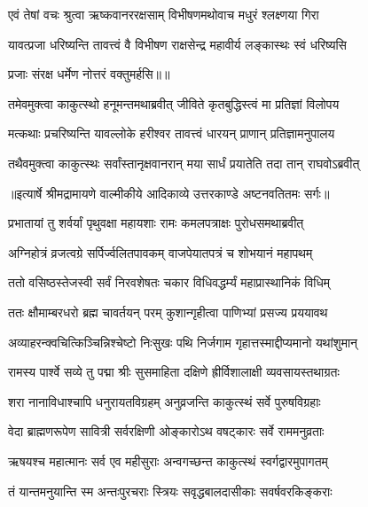 \twolineshloka
{एवं तेषां वचः श्रुत्वा ऋष्कवानररक्षसाम्}
{विभीषणमथोवाच मधुरं श्लक्ष्णया गिरा} %

\twolineshloka
{यावत्प्रजा धरिष्यन्ति तावत्त्वं वै विभीषण}
{राक्षसेन्द्र महावीर्य लङ्कास्थः स्वं धरिष्यसि} %

{प्रजाः संरक्ष धर्मेण नोत्तरं वक्तुमर्हसि॥॥} %

\addtocounter{shlokacount}{1}

\twolineshloka
{तमेवमुक्त्वा काकुत्स्थो हनूमन्तमथाब्रवीत्}
{जीविते कृतबुद्धिस्त्वं मा प्रतिज्ञां विलोपय} %

\twolineshloka
{मत्कथाः प्रचरिष्यन्ति यावल्लोके हरीश्वर}
{तावत्त्वं धारयन् प्राणान् प्रतिज्ञामनुपालय} %

\twolineshloka
{तथैवमुक्त्वा काकुत्स्थः सर्वांस्तानृक्षवानरान्}
{मया सार्धं प्रयातेति तदा तान् राघवोऽब्रवीत्} %


{॥इत्यार्षे श्रीमद्रामायणे वाल्मीकीये आदिकाव्ये उत्तरकाण्डे अष्टनवतितमः सर्गः॥}


\twolineshloka
{प्रभातायां तु शर्वर्यां पृथुवक्षा महायशाः}
{रामः कमलपत्राक्षः पुरोधसमथाब्रवीत्} %

\twolineshloka
{अग्निहोत्रं व्रजत्वग्रे सर्पिर्ज्वलितपावकम्}
{वाजपेयातपत्रं च शोभयानं महापथम्} %

\twolineshloka
{ततो वसिष्ठस्तेजस्वी सर्वं निरवशेषतः}
{चकार विधिवद्धर्म्यं महाप्रास्थानिकं विधिम्} %

\twolineshloka
{ततः क्षौमाम्बरधरो ब्रह्म चावर्तयन् परम्}
{कुशान्गृहीत्वा पाणिभ्यां प्रसज्य प्रययावथ} %

\twolineshloka
{अव्याहरन्क्वचित्किञ्चिन्निश्चेष्टो निःसुखः पथि}
{निर्जगाम गृहात्तस्माद्दीप्यमानो यथांशुमान्} %

\twolineshloka
{रामस्य पार्श्वे सव्ये तु पद्मा श्रीः सुसमाहिता}
{दक्षिणे ह्रीर्विशालाक्षी व्यवसायस्तथाग्रतः} %

\twolineshloka
{शरा नानाविधाश्चापि धनुरायतविग्रहम्}
{अनुव्रजन्ति काकुत्स्थं सर्वे पुरुषविग्रहाः} %

\twolineshloka
{वेदा ब्राह्मणरूपेण सावित्री सर्वरक्षिणी}
{ओङ्कारोऽथ वषट्कारः सर्वे राममनुव्रताः} %

\twolineshloka
{ऋषयश्च महात्मानः सर्व एव महीसुराः}
{अन्वगच्छन्त काकुत्स्थं स्वर्गद्वारमुपागतम्} %

\twolineshloka
{तं यान्तमनुयान्ति स्म अन्तःपुरचराः स्त्रियः}
{सवृद्धबालदासीकाः सवर्षवरकिङ्कराः} %


